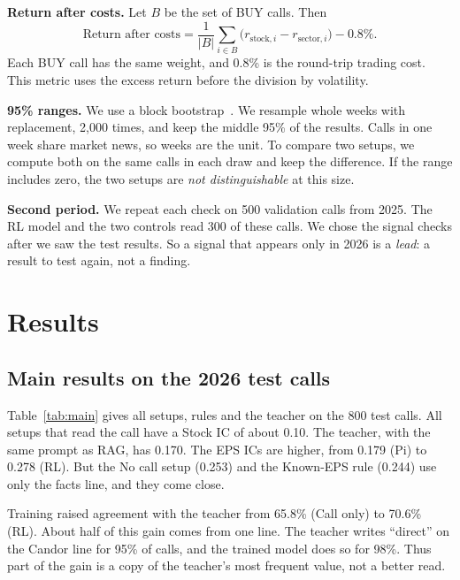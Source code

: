 \documentclass[sigconf,nonacm]{acmart}
\begin{document}
\textbf{Return after costs.} Let $B$ be the set of BUY calls. Then
\begin{equation}\label{eq:ret}
\text{Return after costs} = \frac{1}{|B|}\sum_{i\in B}\big(r_{\text{stock},i} - r_{\text{sector},i}\big) - 0.8\% .
\end{equation}
Each BUY call has the same weight, and 0.8\% is the round-trip trading cost.
This metric uses the excess return before the division by volatility.

\textbf{95\% ranges.} We use a block bootstrap~\cite{kunsch1989}.
We resample whole weeks with replacement, 2{,}000 times, and keep the middle 95\% of the results.
Calls in one week share market news, so weeks are the unit.
To compare two setups, we compute both on the same calls in each draw and keep the difference.
If the range includes zero, the two setups are \emph{not distinguishable} at this size.

\textbf{Second period.} We repeat each check on 500 validation calls from 2025.
The RL model and the two controls read 300 of these calls.
We chose the signal checks after we saw the test results.
So a signal that appears only in 2026 is a \emph{lead}: a result to test again, not a finding.

\section{Results}\label{sec:results}

\subsection{Main results on the 2026 test calls}

Table~\ref{tab:main} gives all setups, rules and the teacher on the 800 test calls.
All setups that read the call have a Stock IC of about 0.10.
The teacher, with the same prompt as RAG, has 0.170.
The EPS ICs are higher, from 0.179 (Pi) to 0.278 (RL).
But the No call setup (0.253) and the Known-EPS rule (0.244) use only the facts line, and they come close.

Training raised agreement with the teacher from 65.8\% (Call only) to 70.6\% (RL).
About half of this gain comes from one line.
The teacher writes ``direct'' on the Candor line for 95\% of calls, and the trained model does so for 98\%.
Thus part of the gain is a copy of the teacher's most frequent value, not a better read.
\end{document}
